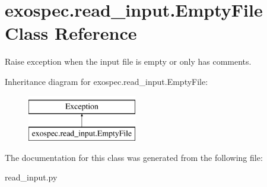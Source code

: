 \hypertarget{classexospec_1_1read__input_1_1_empty_file}{}\section{exospec.\+read\+\_\+input.\+Empty\+File Class Reference}
\label{classexospec_1_1read__input_1_1_empty_file}


Raise exception when the input file is empty or only has comments.  


Inheritance diagram for exospec.\+read\+\_\+input.\+Empty\+File\+:\begin{figure}[H]
\begin{center}
\leavevmode
\includegraphics[height=2.000000cm]{classexospec_1_1read__input_1_1_empty_file}
\end{center}
\end{figure}


The documentation for this class was generated from the following file\+:\begin{DoxyCompactItemize}
\item 
read\+\_\+input.\+py\end{DoxyCompactItemize}
